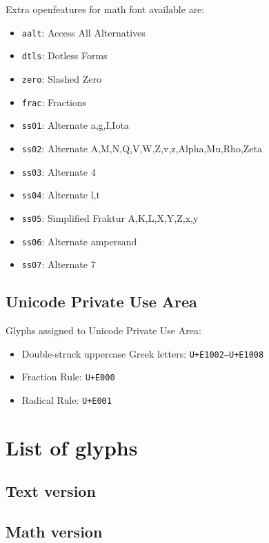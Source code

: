 \documentclass[a4paper]{scrartcl}
\newcommand*{\opt}[1]{\texttt{#1}}
\begin{document}
Extra openfeatures for math font available are:

\begin{itemize}
	\item \opt{aalt}: Access All Alternatives
	\item \opt{dtls}: Dotless Forms
	\item \opt{zero}: Slashed Zero
	\item \opt{frac}: Fractions
	\item \opt{ss01}: Alternate a,g,I,Iota
	\item \opt{ss02}: Alternate A,M,N,Q,V,W,Z,v,z,Alpha,Mu,Rho,Zeta
	\item \opt{ss03}: Alternate 4
	\item \opt{ss04}: Alternate l,t
	\item \opt{ss05}: Simplified Fraktur A,K,L,X,Y,Z,x,y
	\item \opt{ss06}: Alternate ampersand
	\item \opt{ss07}: Alternate 7
\end{itemize}

\subsection{Unicode Private Use Area}

Glyphs assigned to Unicode Private Use Area:

\begin{itemize}
	\item Double-struck uppercase Greek letters: \opt{U+E1002–U+E1008}
	\item Fraction Rule: \opt{U+E000}
	\item Radical Rule: \opt{U+E001}
\end{itemize}

\pagebreak

\section{List of glyphs}

\subsection{Text version}


\pagebreak

\subsection{Math version}
\end{document}
